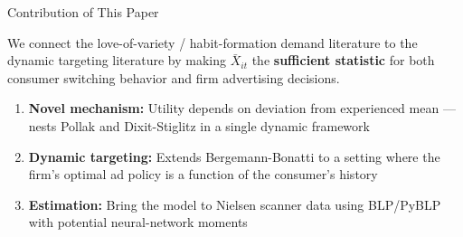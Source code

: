 \documentclass[aspectratio=169,professionalfonts]{beamer}
\newcommand{\hl}[1]{\textbf{\textcolor{UGARed}{#1}}}
\begin{document}
\begin{frame}{Contribution of This Paper}
  \begin{tcolorbox}[colback=red!5!white, colframe=UGARed, title=\textbf{Where This Project Sits}]
    We connect the love-of-variety / habit-formation demand literature to the dynamic
    targeting literature by making $\bar{X}_{it}$ the \hl{sufficient statistic} for both
    consumer switching behavior and firm advertising decisions.
  \end{tcolorbox}
  \vspace{8pt}
  \begin{enumerate}
    \item \hl{Novel mechanism:} Utility depends on deviation from experienced mean ---
          nests Pollak and Dixit-Stiglitz in a single dynamic framework
    \vspace{4pt}
    \item \hl{Dynamic targeting:} Extends Bergemann-Bonatti to a setting where the firm's
          optimal ad policy is a function of the consumer's history
    \vspace{4pt}
    \item \hl{Estimation:} Bring the model to Nielsen scanner data using BLP/PyBLP
          with potential neural-network moments
  \end{enumerate}
\end{frame}
\end{document}
